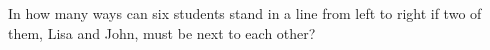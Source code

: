In how many ways can six students stand in a line from left to right if two of them, Lisa and John, must be next to each other?
